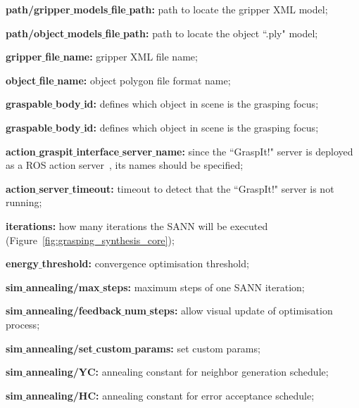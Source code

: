 \begin{itemize_jp}
    \item \textbf{path/gripper$\_$models$\_$file$\_$path:} path to locate the gripper XML model;
    \item \textbf{path/object$\_$models$\_$file$\_$path:} path to locate the object ``.ply" model;
    \item \textbf{gripper$\_$file$\_$name:} gripper XML file name;
    \item \textbf{object$\_$file$\_$name:} object polygon file format name;
    \item \textbf{graspable$\_$body$\_$id:} defines which object in scene is the grasping focus;
    \item \textbf{graspable$\_$body$\_$id:} defines which object in scene is the grasping focus;
    \item \textbf{action$\_$graspit$\_$interface$\_$server$\_$name:} since the ``GraspIt!" server is deployed as a \ac{ROS} action server~\cite{ros_action_lib}, its names should be specified;
    \item \textbf{action$\_$server$\_$timeout:} timeout to detect that the  ``GraspIt!" server is not running; 
    \item \textbf{iterations:} how many iterations the \ac{SANN} will be executed (Figure~\ref{fig:grasping_synthesis_core});
    \item \textbf{energy$\_$threshold:} convergence optimisation threshold; 
    \item \textbf{sim$\_$annealing/max$\_$steps:} maximum steps of one \ac{SANN} iteration;
    \item \textbf{sim$\_$annealing/feedback$\_$num$\_$steps:} allow visual update of optimisation process;
    \item \textbf{sim$\_$annealing/set$\_$custom$\_$params:} set custom params;
    \item \textbf{sim$\_$annealing/YC:} annealing constant for neighbor generation schedule;
    \item \textbf{sim$\_$annealing/HC:} annealing constant for error acceptance schedule;

\end{itemize_jp}
